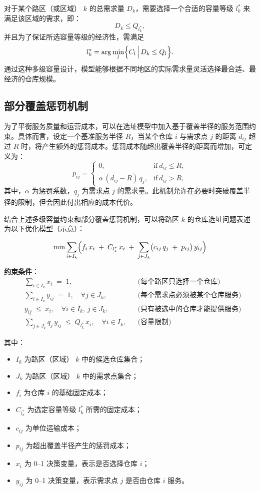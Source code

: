 \documentclass[12pt,a4paper,twoside]{ctexbook}
\begin{document}
对于某个路区（或区域） $k$ 的总需求量 $D_k$，需要选择一个合适的容量等级 $l_k^*$ 来满足该区域的需求，即：
\[
D_k \leq Q_{l_k^*},
\]
并且为了保证所选容量等级的经济性，需满足
\[
l_k^* = \arg\min_{l}\Bigl\{C_l \,\Big\vert\, D_k \leq Q_{l}\Bigr\}.
\]
通过这种多级容量设计，模型能够根据不同地区的实际需求量灵活选择最合适、最经济的仓库规模。

\subsection{部分覆盖惩罚机制}
为了平衡服务质量和运营成本，可以在选址模型中加入基于覆盖半径的服务范围约束。具体而言，设定一个基准服务半径 $R$，当某个仓库 $i$ 与需求点 $j$ 的距离 $d_{ij}$ 超过 $R$ 时，将产生额外的惩罚成本。惩罚成本随超出覆盖半径的距离而增加，可定义为：
\[
p_{ij} = 
\begin{cases}
0, & \text{if}\ d_{ij} \le R,\\[6pt]
\alpha\,(d_{ij} - R)\,q_j, & \text{if}\ d_{ij} > R,
\end{cases}
\]
其中，$\alpha$ 为惩罚系数，$q_j$ 为需求点 $j$ 的需求量。此机制允许在必要时突破覆盖半径的限制，但会因此付出相应的成本代价。

结合上述多级容量约束和部分覆盖惩罚机制，可以将路区 $k$ 的仓库选址问题表述为以下优化模型（示意）：

\begin{equation}
\min \sum_{i \in I_k} \Bigl(f_i \, x_i \;+\; C_{l_k^*}\, x_i \;+\; \sum_{j \in J_k} \bigl(c_{ij}\, q_j \;+\; p_{ij}\bigr)\, y_{ij}\Bigr)
\label{eq:objective}
\end{equation}

\noindent
\textbf{约束条件}：
\begin{align}
& \sum_{i \in I_k} x_i \;=\; 1, 
&& \text{(每个路区只选择一个仓库)} \label{eq:con1}\\[6pt]
& \sum_{i \in I_k} y_{ij} \;=\; 1, \quad \forall j \in J_k,
&& \text{(每个需求点必须被某个仓库服务)} \label{eq:con2}\\[6pt]
& y_{ij} \;\le\; x_i, \quad \forall i \in I_k,\, j \in J_k,
&& \text{(只有被选中的仓库才能提供服务)} \label{eq:con3}\\[6pt]
& \sum_{j \in J_k} q_j \, y_{ij} \;\le\; Q_{l_k^*}\, x_i, \quad \forall i \in I_k,
&& \text{(容量限制)} \label{eq:con4}
\end{align}

\noindent 其中：
\begin{itemize}
  \item $I_k$ 为路区（区域） $k$ 中的候选仓库集合；
  \item $J_k$ 为路区（区域） $k$ 中的需求点集合；
  \item $f_i$ 为仓库 $i$ 的基础固定成本；
  \item $C_{l_k^*}$ 为选定容量等级 $l_k^*$ 所需的固定成本；
  \item $c_{ij}$ 为单位运输成本；
  \item $p_{ij}$ 为超出覆盖半径产生的惩罚成本；
  \item $x_i$ 为 0–1 决策变量，表示是否选择仓库 $i$；
  \item $y_{ij}$ 为 0–1 决策变量，表示需求点 $j$ 是否由仓库 $i$ 服务。
\end{itemize}
\end{document}

